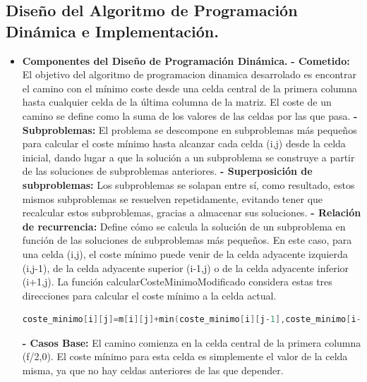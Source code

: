 \documentclass[12pt, letterpaper]{article}
\begin{document}
    \subsection{Diseño del Algoritmo de Programación Dinámica e Implementación.}
      \begin{itemize}
        \item \textbf{Componentes del Diseño de Programación Dinámica.}
          \subitem\textbf{- Cometido:}
            El objetivo del algoritmo de programacion dinamica desarrolado es encontrar el camino con el mínimo coste desde una celda central de la primera columna hasta cualquier celda de la última columna de la matriz. 
            El coste de un camino se define como la suma de los valores de las celdas por las que pasa.
          \subitem\textbf{- Subproblemas:}
            El problema se descompone en subproblemas más pequeños para calcular el coste mínimo hasta alcanzar cada celda (i,j) desde la celda inicial, 
            dando lugar a que la solución a un subproblema se construye a partir de las soluciones de subproblemas anteriores.
          \subitem\textbf{- Superposición de subproblemas:}
            Los subproblemas se solapan entre sí, como resultado, estos mismos subproblemas se resuelven repetidamente,
            evitando tener que recalcular estos subproblemas, gracias a almacenar sus soluciones.
          \subitem\textbf{- Relación de recurrencia:}
            Define cómo se calcula la solución de un subproblema en función de las soluciones de subproblemas más pequeños. 
            En este caso, para una celda (i,j), el coste mínimo puede venir de la celda adyacente izquierda (i,j-1), de la celda adyacente superior (i-1,j) o de la celda adyacente inferior (i+1,j).
            La función calcularCosteMinimoModificado considera estas tres direcciones para calcular el coste mínimo a la celda actual.
            \begin{lstlisting}[language=C++, basicstyle=\ttfamily\footnotesize,breaklines=true]
    coste_minimo[i][j]=m[i][j]+min(coste_minimo[i][j-1],coste_minimo[i-1][j],coste_minimo[i+1][j])
            \end{lstlisting}
  \newpage %
          \subitem\textbf{- Casos Base:}
            El camino comienza en la celda central de la primera columna (f/2,0).
            El coste mínimo para esta celda es simplemente el valor de la celda misma, ya que no hay celdas anteriores de las que depender.
            \begin{lstlisting}[language=C++, basicstyle=\ttfamily\footnotesize]

\end{lstlisting}
\end{itemize}
\end{document}
